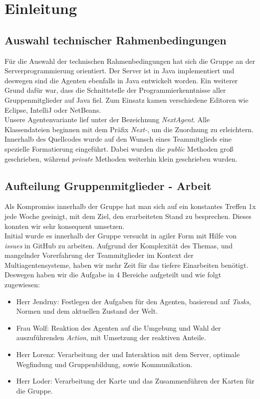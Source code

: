 \section{Einleitung}

\subsection{Auswahl technischer Rahmenbedingungen}
Für die Auswahl der technischen Rahmenbedingungen hat sich die Gruppe an der Serverprogrammierung orientiert. Der Server ist in Java implementiert und deswegen sind die Agenten ebenfalls in Java entwickelt worden. Ein weiterer Grund dafür war, dass die Schnittstelle der Programmierkenntnisse aller Gruppenmitglieder auf Java fiel. Zum Einsatz kamen verschiedene Editoren wie Eclipse\cite{eclipse}, IntelliJ\cite{intellij} oder NetBeans\cite{netbeans}. \\

Unsere Agentenvariante lief unter der Bezeichnung \textit{NextAgent}. 
Alle Klassendateien beginnen mit dem Präfix \textit{Next-}, um die Zuordnung zu erleichtern. \\

Innerhalb des Quellcodes wurde auf den Wunsch eines Teammitglieds eine spezielle Formatierung eingeführt. Dabei wurden die \textit{public} Methoden groß geschrieben, während \textit{private} Methoden weiterhin klein geschrieben wurden.

\subsection{Aufteilung Gruppenmitglieder - Arbeit}

Als Kompromiss innerhalb der Gruppe hat man sich auf ein konstantes Treffen 1x jede Woche geeinigt, mit dem Ziel, den erarbeiteten Stand zu besprechen. Dieses konnten wir sehr konsequent umsetzen. \\

Initial wurde es innerhalb der Gruppe versucht in agiler Form mit Hilfe von \textit{issues} in GitHub zu arbeiten. Aufgrund der Komplexität des Themas, und mangelnder Vorerfahrung der Teammitglieder im Kontext der Multiagentensysteme, haben wir mehr Zeit für das tiefere Einarbeiten benötigt. Deswegen haben wir die Aufgabe in 4 Bereiche aufgeteilt und wie folgt zugewiesen: \\

\begin{itemize}
    \item Herr Jendrny: Festlegen der Aufgaben für den Agenten, basierend auf \textit{Tasks}, Normen und dem aktuellen Zustand der Welt.  
    \item Frau Wolf: Reaktion des Agenten auf die Umgebung und Wahl der auszuführenden \textit{Action}, mit Umsetzung der reaktiven Anteile.
    \item Herr Lorenz: Verarbeitung der \Percepts und Interaktion mit dem Server, optimale Wegfindung und Gruppenbildung, sowie Kommunikation.
    \item Herr Loder: Verarbeitung der Karte und das Zusammenführen der Karten für die Gruppe.
\end{itemize}

